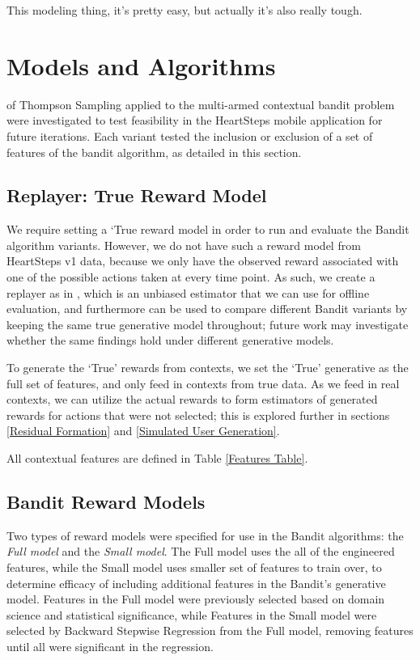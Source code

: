 \begin{savequote}[75mm]
This modeling thing, it's pretty easy, but actually it's also really tough.
\end{savequote}

\chapter{Models and Algorithms}
\label{Models}

 of Thompson Sampling applied to the multi-armed contextual bandit problem were investigated to test feasibility in the HeartSteps mobile application for future iterations.  Each variant tested the inclusion or exclusion of a set of features of the bandit algorithm, as detailed in this section.


\section{Replayer: True Reward Model}
\label{Models/Reward Generative Models}

We require setting a `True reward model in order to run and evaluate the Bandit algorithm variants.  However, we do not have such a reward model from HeartSteps v1 data, because we only have the observed reward associated with one of the possible actions taken at every time point.  As such, we create a replayer as in \citet{Li2011}, which is an unbiased estimator that we can use for offline evaluation, and furthermore can be used to compare different Bandit variants by keeping the same true generative model throughout; future work may investigate whether the same findings hold under different generative models.

To generate the `True' rewards from contexts, we set the `True' generative as the full set of features, and only feed in contexts from true data.  As we feed in real contexts, we can utilize the actual rewards to form estimators of generated rewards for actions that were not selected; this is explored further in sections \ref{Residual Formation} and \ref{Simulated User Generation}.

All contextual features are defined in Table \ref{Features Table}.  


\section{Bandit Reward Models}
Two types of reward models were specified for use in the Bandit algorithms: the {\it Full model} and the {\it Small model}. 
\label{Small Set Features} The Full model uses the all of the engineered features, while the Small model uses smaller set of features to train over, to determine efficacy of including additional features in the Bandit's generative model.  Features in the Full model were previously selected based on domain science and statistical significance, while Features in the Small model were selected by Backward Stepwise Regression from the Full model, removing features until all were significant in the regression.

